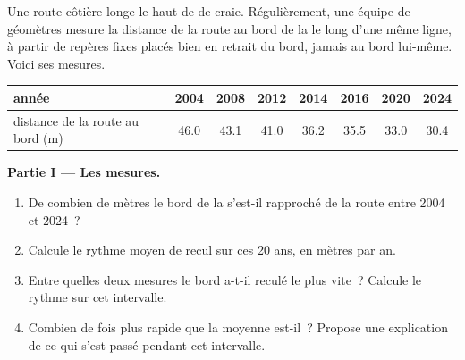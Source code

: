 \begin{problem}
\label{pb:g9:landforms:1}
Une route côtière longe le haut de  de craie. Régulièrement, une
équipe de géomètres mesure la distance de la route au bord de la 
le long d'une même ligne, à partir de repères fixes placés bien en
retrait du bord, jamais au bord lui-même. Voici ses mesures.

\begin{center}
{\small
\begin{tabular}{|l|c|c|c|c|c|c|c|}
\hline
année & 2004 & 2008 & 2012 & 2014 & 2016 & 2020 & 2024 \\
\hline
distance de la route au bord (m) & 46.0 & 43.1 & 41.0 & 36.2 & 35.5 & 33.0 & 30.4 \\
\hline
\end{tabular}}
\end{center}

\noindent\textbf{Partie I --- Les mesures.}\par\nopagebreak
\begin{enumerate}[beginpenalty=10000]
  \item De combien de mètres le bord de la  s'est-il rapproché de
        la route entre 2004 et 2024~?
  \item Calcule le rythme moyen de recul sur ces 20 ans, en mètres par an.
  \item Entre quelles deux mesures le bord a-t-il reculé le plus vite~?
        Calcule le rythme sur cet intervalle.
  \item Combien de fois plus rapide que la moyenne est-il~? Propose une
        explication de ce qui s'est passé pendant cet intervalle.
\end{enumerate}

\begin{omfigure}


\end{omfigure}
\end{problem}
